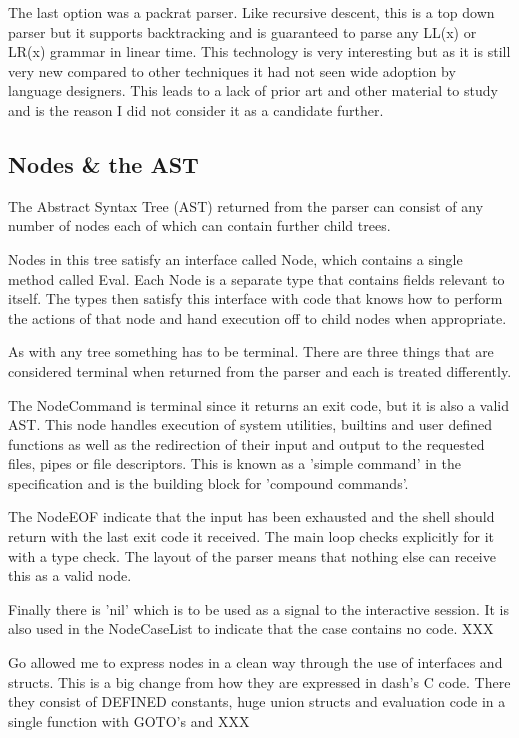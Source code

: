 The last option was a packrat parser.
Like recursive descent, this is a top down parser but it supports backtracking and is guaranteed to parse any LL(x) or LR(x) grammar in linear time.
This technology is very interesting but as it is still very new compared to other techniques it had not seen wide adoption by language designers.
This leads to a lack of prior art and other material to study and is the reason I did not consider it as a candidate further.

\subsection{Nodes \& the AST}
The Abstract Syntax Tree (AST) returned from the parser can consist of any number of nodes each of which can contain further child trees.

Nodes in this tree satisfy an interface called Node, which contains a single method called Eval.
Each Node is a separate type that contains fields relevant to itself.
The types then satisfy this interface with code that knows how to perform the actions of that node and hand execution off to child nodes when appropriate.

As with any tree something has to be terminal.
There are three things that are considered terminal when returned from the parser and each is treated differently.

The NodeCommand is terminal since it returns an exit code, but it is also a valid AST.
This node handles execution of system utilities, builtins and user defined functions as well as the redirection of their input and output to the requested files, pipes or file descriptors.
This is known as a 'simple command' in the specification and is the building block for 'compound commands'.

The NodeEOF indicate that the input has been exhausted and the shell should return with the last exit code it received.
The main loop checks explicitly for it with a type check.
The layout of the parser means that nothing else can receive this as a valid node.

Finally there is 'nil' which is to be used as a signal to the interactive session.
It is also used in the NodeCaseList to indicate that the case contains no code.
XXX %

Go allowed me to express nodes in a clean way through the use of interfaces and structs.
This is a big change from how they are expressed in dash's C code.
There they consist of DEFINED constants, huge union structs and evaluation code in a single function with GOTO's and XXX

